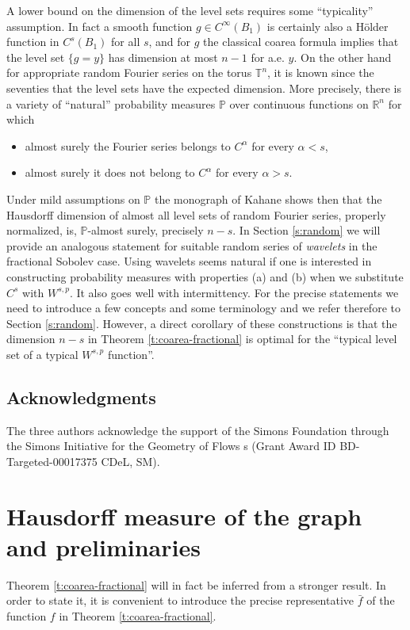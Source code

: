 \documentclass[11pt,reqno]{amsart}
\theoremstyle{definition}
\numberwithin{equation}{section}
\begin{document}
A lower bound on the dimension of the level sets requires some ``typicality'' assumption. In fact a smooth function $g\in C^\infty (B_1)$ is certainly also a H\"older function in $C^s (B_1)$ for all $s$, and for $g$ the classical coarea formula implies that the level set $\{g=y\}$ has dimension at most $n-1$ for a.e. $y$. On the other hand for appropriate random Fourier series on the torus $\mathbb T^n$, it is known since the seventies that the level sets have the expected dimension. More precisely, there is a variety of ``natural'' probability measures $\mathbb P$ over continuous functions on $\mathbb R^n$ for which
\begin{itemize}
\item[(a)] almost surely the Fourier series belongs to $C^\alpha$ for every $\alpha <s$,
\item[(b)] almost surely it does not belong to $C^\alpha$ for every $\alpha>s$.
\end{itemize}
Under mild assumptions on $\mathbb P$ the monograph \cite{Kahane} of Kahane shows then that the Hausdorff dimension of almost all level sets of random Fourier series, properly normalized, is, $\mathbb P$-almost surely, precisely $n-s$. In Section \ref{s:random} we will provide an analogous statement for suitable random series of {\em wavelets} in the fractional Sobolev case. Using wavelets seems natural if one is interested in constructing probability measures with properties (a) and (b) when we substitute $C^s$ with $W^{s,p}$. It also goes well with intermittency. For the precise statements we need to introduce a few concepts and some terminology and we refer therefore to Section \ref{s:random}. However, a direct corollary of these constructions is that the dimension $n-s$ in Theorem \ref{t:coarea-fractional} is optimal for the ``typical level set of a typical $W^{s,p}$ function''. 

\subsection{Acknowledgments} The three authors acknowledge the support of the Simons Foundation through the Simons Initiative for the Geometry of Flows s (Grant Award ID BD-
Targeted-00017375 CDeL, SM).

\section{Hausdorff measure of the graph and preliminaries}

Theorem \ref{t:coarea-fractional} will in fact be inferred from a stronger result. In order to state it, it is convenient to introduce the precise representative $\bar f$ of the function $f$ in Theorem \ref{t:coarea-fractional}. 
\end{document}
